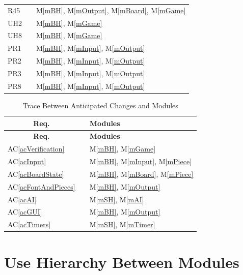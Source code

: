 \documentclass[12pt, titlepage]{article}
\newcommand{\acref}[1]{AC\ref{#1}}
\newcommand{\mref}[1]{M\ref{#1}}
\begin{document}
\begin{center}
\begin{longtable}{l l l}
        R45 && \mref{mBH}, \mref{mOutput}, \mref{mBoard}, \mref{mGame}\\
        UH2 && \mref{mBH}, \mref{mGame}\\
        UH8 && \mref{mBH}, \mref{mGame}\\
        PR1 && \mref{mBH}, \mref{mInput}, \mref{mOutput}\\
        PR2 && \mref{mBH}, \mref{mInput}, \mref{mOutput}\\
        PR3 && \mref{mBH}, \mref{mInput}, \mref{mOutput}\\
        PR8 && \mref{mBH}, \mref{mInput}, \mref{mOutput}
    \end{longtable}
\end{center}

\begin{center}
    \begin{longtable}{l l l}
        \caption{Trace Between Anticipated Changes and Modules} \\
        
        \hline \multicolumn{1}{c}{\textbf{Req.}} & \multicolumn{1}{c}{} & \multicolumn{1}{l}{\textbf{Modules}} \\ \hline 
        \endfirsthead
        
        \multicolumn{1}{c}{\textbf{Req.}} & \multicolumn{1}{c}{} & \multicolumn{1}{l}{\textbf{Modules}} \\ \hline 
        \endhead
        
        \hline \hline
        \endlastfoot
        
        \acref{acVerification} && \mref{mBH}, \mref{mGame}\\
        \acref{acInput} && \mref{mBH}, \mref{mInput}, \mref{mPiece}\\
        \acref{acBoardState} && \mref{mBH}, \mref{mBoard}, \mref{mPiece}\\
        \acref{acFontAndPieces} && \mref{mBH}, \mref{mOutput}\\
        \acref{acAI} && \mref{mSH}, \mref{mAI}\\
        \acref{acGUI} && \mref{mBH}, \mref{mOutput}\\
        \acref{acTimers} && \mref{mSH}, \mref{mTimer}
    \end{longtable}
\end{center}

\section{Use Hierarchy Between Modules} \label{SecUse}
\end{document}
